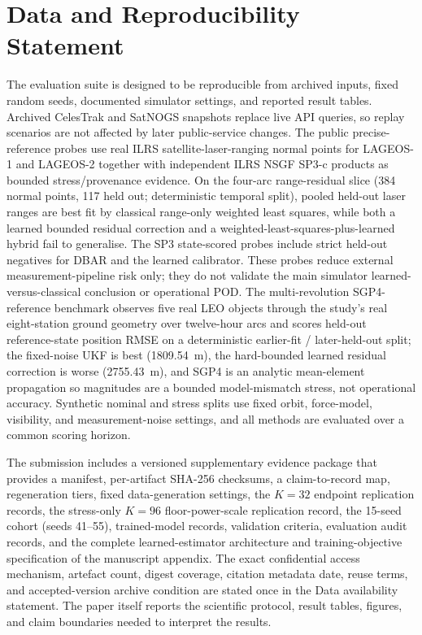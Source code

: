 \section{Data and Reproducibility Statement}
\label{sec:data-reproducibility}

The evaluation suite is designed to be reproducible from archived inputs, fixed random seeds, documented simulator settings, and reported result tables. Archived CelesTrak and SatNOGS snapshots replace live API queries, so replay scenarios are not affected by later public-service changes. The public precise-reference probes use real ILRS satellite-laser-ranging normal points for LAGEOS-1 and LAGEOS-2 together with independent ILRS NSGF SP3-c products as bounded stress/provenance evidence. On the four-arc range-residual slice (384 normal points, 117 held out; deterministic temporal split), pooled held-out laser ranges are best fit by classical range-only weighted least squares, while both a learned bounded residual correction and a weighted-least-squares-plus-learned hybrid fail to generalise. The SP3 state-scored probes include strict held-out negatives for DBAR and the learned calibrator. These probes reduce external measurement-pipeline risk only; they do not validate the main simulator learned-versus-classical conclusion or operational POD. The multi-revolution SGP4-reference benchmark observes five real LEO objects through the study's real eight-station ground geometry over twelve-hour arcs and scores held-out reference-state position RMSE on a deterministic earlier-fit / later-held-out split; the fixed-noise UKF is best (1809.54~m), the hard-bounded learned residual correction is worse (2755.43~m), and SGP4 is an analytic mean-element propagation so magnitudes are a bounded model-mismatch stress, not operational accuracy. Synthetic nominal and stress splits use fixed orbit, force-model, visibility, and measurement-noise settings, and all methods are evaluated over a common scoring horizon.

The submission includes a versioned supplementary evidence package that provides a manifest, per-artifact SHA-256 checksums, a claim-to-record map, regeneration tiers, fixed data-generation settings, the $K=32$ endpoint replication records, the stress-only $K=96$ floor-power-scale replication record, the 15-seed cohort (seeds 41--55), trained-model records, validation criteria, evaluation audit records, and the complete learned-estimator architecture and training-objective specification of the manuscript appendix. The exact confidential access mechanism, artefact count, digest coverage, citation metadata date, reuse terms, and accepted-version archive condition are stated once in the Data availability statement. The paper itself reports the scientific protocol, result tables, figures, and claim boundaries needed to interpret the results.

